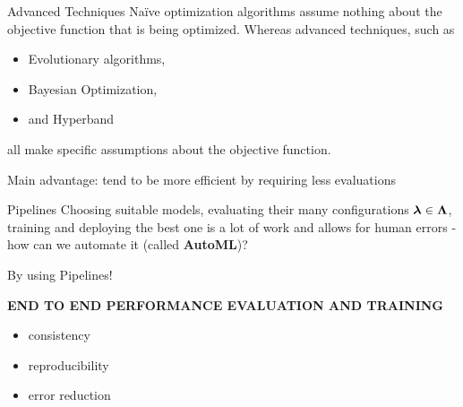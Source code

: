 \documentclass[11pt,compress,t,notes=noshow, xcolor=table]{beamer}
\begin{document}
\begin{vbframe}{Advanced Techniques}
Naïve optimization algorithms assume nothing about the objective function that is being optimized. Whereas advanced techniques, such as
\begin{itemize}
\item Evolutionary algorithms,
\item Bayesian Optimization,
\item and Hyperband 
\end{itemize}
all make specific assumptions about the objective function.

\vspace{10pt}

Main advantage: tend to be more efficient by requiring less evaluations

\end{vbframe}

\begin{vbframe}{Pipelines}
Choosing suitable models, evaluating their many configurations $\bm{\lambda} \in \bm{\Lambda}$, training and deploying the best one is a lot of work and allows for human errors - how can we automate it (called \textbf{AutoML})?

\vspace{10pt}

By using Pipelines!

\vspace{10pt}%

\textbf{END TO END PERFORMANCE EVALUATION AND TRAINING}
\begin{itemize}
\item consistency
\item reproducibility
\item error reduction
\end{itemize}
\end{vbframe}

\endlecture
\end{document}
